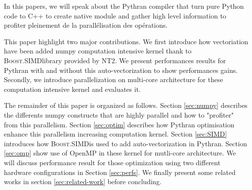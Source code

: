 \documentclass[10pt, onecolumn, preprint]{sigplanconf}
\providecommand{\boostsimd}{\textsc{Boost.SIMD}}
\begin{document}
%
%
%
%
%
%
%



In this papers, we will speak about the Pythran compiler that turn pure Python
code to C++ to create native module and gather high level information to
profiter pleinement de la parallélisation des opérations.

This paper highlight two major contributions. We first introduce how vectoriation
have been added numpy computation intensive kernel thank to
\boostsimd library provided by NT2. We present performances results for Pythran
with and without this auto-vectorization to show performances gains.
Secondly, we introduce parallelization on multi-core architecture for these
computation intensive kernel and evaluates it.

The remainder of this paper is organized as follows. Section \ref{sec:numpy}
describes the differents numpy constructs that are highly parallel and how to
"profiter" from this parallelism. Section \ref{sec:optim} describes how Pythran
optimisation enhance this parallelism increasing computation kernel. Section 
\ref{sec:SIMD} introduces how \boostsimd is used to add auto-vectorization in
Pythran. Section \ref{sec:omp} show use of OpenMP in these kernel for
mutli-core architecture. We will discuss performance result for those
optimization using two different hardware configurations in Section
\ref{sec:perfs}. We finally present some related works in section
\ref{sec:related-work} before concluding.
\end{document}
